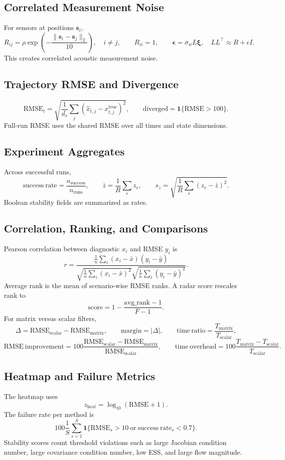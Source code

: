 \documentclass[11pt]{article}
\newcommand{\RMSE}{\mathrm{RMSE}}
\newcommand{\ind}{\mathbf{1}}
\begin{document}
\subsection*{Correlated Measurement Noise}
For sensors at positions \(\bm s_i\),
\[
R_{ij}=\rho\exp\left(-\frac{\|\bm s_i-\bm s_j\|_2}{10}\right),\quad i\ne j,\qquad
R_{ii}=1,\qquad
\bm\epsilon=\sigma_w L\bm\xi,\quad LL^\top\approx R+\epsilon I.
\]
This creates correlated acoustic measurement noise.

\subsection*{Trajectory RMSE and Divergence}
\[
\RMSE_t=\sqrt{\frac{1}{d_s}\sum_j(\hat x_{t,j}-x^{\mathrm{true}}_{t,j})^2},\qquad
\mathrm{diverged}=\ind\{\RMSE>100\}.
\]
Full-run RMSE uses the shared RMSE over all times and state dimensions.

\subsection*{Experiment Aggregates}
Across successful runs,
\[
\mathrm{success\ rate}=\frac{n_{\mathrm{success}}}{n_{\mathrm{runs}}},
\qquad
\bar z=\frac{1}{R}\sum_rz_r,\qquad
s_z=\sqrt{\frac{1}{R}\sum_r(z_r-\bar z)^2}.
\]
Boolean stability fields are summarized as rates.

\subsection*{Correlation, Ranking, and Comparisons}
Pearson correlation between diagnostic \(x_i\) and RMSE \(y_i\) is
\[
r=\frac{\frac{1}{n}\sum_i(x_i-\bar x)(y_i-\bar y)}
{\sqrt{\frac{1}{n}\sum_i(x_i-\bar x)^2}\sqrt{\frac{1}{n}\sum_i(y_i-\bar y)^2}}.
\]
Average rank is the mean of scenario-wise RMSE ranks. A radar score rescales rank to
\[
\mathrm{score}=1-\frac{\mathrm{avg\_rank}-1}{F-1}.
\]
For matrix versus scalar filters,
\[
\Delta=\RMSE_{\mathrm{scalar}}-\RMSE_{\mathrm{matrix}},\qquad
\mathrm{margin}=|\Delta|,\qquad
\mathrm{time\ ratio}=\frac{T_{\mathrm{matrix}}}{T_{\mathrm{scalar}}},
\]
\[
\mathrm{RMSE\ improvement}=100\frac{\RMSE_{\mathrm{scalar}}-\RMSE_{\mathrm{matrix}}}{\RMSE_{\mathrm{scalar}}},
\qquad
\mathrm{time\ overhead}=100\frac{T_{\mathrm{matrix}}-T_{\mathrm{scalar}}}{T_{\mathrm{scalar}}}.
\]

\subsection*{Heatmap and Failure Metrics}
The heatmap uses
\[
z_{\mathrm{heat}}=\log_{10}(\RMSE+1).
\]
The failure rate per method is
\[
100\frac{1}{S}\sum_{s=1}^{S}\ind\{\RMSE_s>10\ \mathrm{or}\ \mathrm{success\ rate}_s<0.7\}.
\]
Stability scores count threshold violations such as large Jacobian condition number, large covariance condition number, low ESS, and large flow magnitude.
\end{document}
